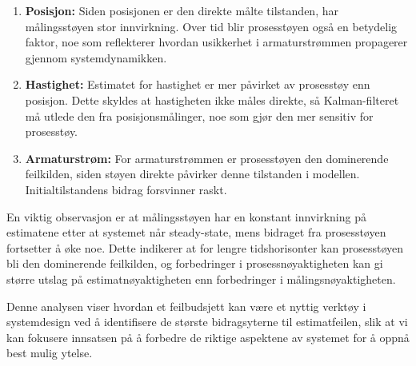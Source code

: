 \documentclass[a4paper,12pt]{article}
\theoremstyle{plain}
\begin{document}
\begin{enumerate}
    \item \textbf{Posisjon:} Siden posisjonen er den direkte målte tilstanden, har målingsstøyen stor innvirkning. Over tid blir prosesstøyen også en betydelig faktor, noe som reflekterer hvordan usikkerhet i armaturstrømmen propagerer gjennom systemdynamikken.
    
    \item \textbf{Hastighet:} Estimatet for hastighet er mer påvirket av prosesstøy enn posisjon. Dette skyldes at hastigheten ikke måles direkte, så Kalman-filteret må utlede den fra posisjonsmålinger, noe som gjør den mer sensitiv for prosesstøy.
    
    \item \textbf{Armaturstrøm:} For armaturstrømmen er prosesstøyen den dominerende feilkilden, siden støyen direkte påvirker denne tilstanden i modellen. Initialtilstandens bidrag forsvinner raskt.
\end{enumerate}

En viktig observasjon er at målingsstøyen har en konstant innvirkning på estimatene etter at systemet når steady-state, mens bidraget fra prosesstøyen fortsetter å øke noe. Dette indikerer at for lengre tidshorisonter kan prosesstøyen bli den dominerende feilkilden, og forbedringer i prosessnøyaktigheten kan gi større utslag på estimatnøyaktigheten enn forbedringer i målingsnøyaktigheten.

Denne analysen viser hvordan et feilbudsjett kan være et nyttig verktøy i systemdesign ved å identifisere de største bidragsyterne til estimatfeilen, slik at vi kan fokusere innsatsen på å forbedre de riktige aspektene av systemet for å oppnå best mulig ytelse.
\end{document}
